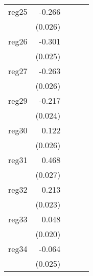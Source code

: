 {\begin{longtable}{l*{4}{D{.}{.}{-1}}}
\addlinespace
reg25       &      -0.266\sym{***}&                     &                     &                     \\
            &     (0.026)         &                     &                     &                     \\
\addlinespace
reg26       &      -0.301\sym{***}&                     &                     &                     \\
            &     (0.025)         &                     &                     &                     \\
\addlinespace
reg27       &      -0.263\sym{***}&                     &                     &                     \\
            &     (0.026)         &                     &                     &                     \\
\addlinespace
reg29       &      -0.217\sym{***}&                     &                     &                     \\
            &     (0.024)         &                     &                     &                     \\
\addlinespace
reg30       &       0.122\sym{***}&                     &                     &                     \\
            &     (0.026)         &                     &                     &                     \\
\addlinespace
reg31       &       0.468\sym{***}&                     &                     &                     \\
            &     (0.027)         &                     &                     &                     \\
\addlinespace
reg32       &       0.213\sym{***}&                     &                     &                     \\
            &     (0.023)         &                     &                     &                     \\
\addlinespace
reg33       &       0.048\sym{*}  &                     &                     &                     \\
            &     (0.020)         &                     &                     &                     \\
\addlinespace
reg34       &      -0.064\sym{*}  &                     &                     &                     \\
            &     (0.025)         &                     &                     &                     \\

\end{longtable}}
